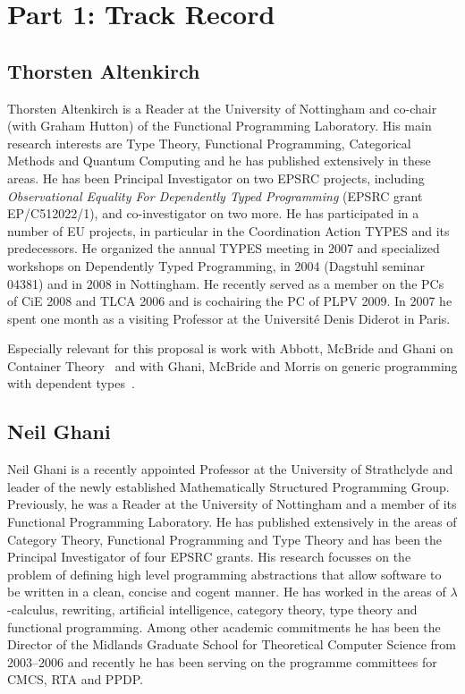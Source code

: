\documentclass[a4paper]{article}
\begin{document}
\section*{Part 1: Track Record}

\subsection*{Thorsten Altenkirch}

\sloppy Thorsten Altenkirch is a Reader at the University of
Nottingham and co-chair (with Graham Hutton) of the Functional
Programming Laboratory. His main research interests are Type Theory,
Functional Programming, Categorical Methods and Quantum Computing and
he has published extensively in these areas. He has been Principal
Investigator on two EPSRC projects, including \textit{Observational
  Equality For Dependently Typed Programming} (EPSRC grant
EP/C512022/1), and co-investigator on two more.  He has participated
in a number of EU projects, in particular in the Coordination Action
TYPES and its predecessors. He organized the annual TYPES meeting
in 2007 and specialized workshops on Dependently Typed Programming, in
2004 (Dagstuhl seminar 04381) and in 2008 in Nottingham. He
recently served as a member on the PCs of CiE 2008 and TLCA 2006 and
is cochairing the PC of PLPV 2009. In 2007 he spent one month as a
visiting Professor  at the
Universit\'{e} Denis Diderot in Paris.

Especially relevant for
this %
proposal is
work with Abbott,
McBride and Ghani on 
Container Theory~\cite{alti:fossacs03,alti:tlca03,alti:icalp04,alti:jpartial,alti:mpc04,alti:cont-tcs}
and with Ghani, McBride and Morris on generic programming with
dependent types~\cite{alti:wcgp02,alti:regular,txa:ssgp06,alti:cats07,alti:jcats07}.


\subsection*{Neil Ghani}

Neil Ghani is a recently appointed Professor at the University of
Strathclyde and leader of the newly established Mathematically
Structured Programming Group. Previously, he was a Reader at the
University of Nottingham and a member of its Functional Programming
Laboratory. He has published extensively in the areas of
Category Theory, Functional Programming and Type Theory and has been
the Principal Investigator of four EPSRC grants. His research focusses
on the problem of defining high level programming abstractions that
allow software to be written in a clean, concise and cogent
manner. He has worked in the areas of $\lambda$-calculus, rewriting,
artificial intelligence, category theory, type theory and functional
programming. Among other academic commitments he has been
the Director of the Midlands Graduate School for Theoretical Computer
Science from 2003--2006 and recently he has been serving on the
programme committees for CMCS, RTA and PPDP.
\end{document}
